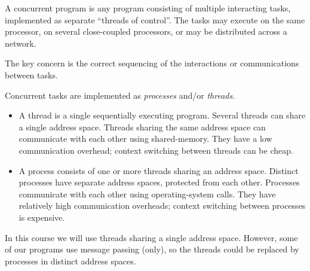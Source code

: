 \documentclass[notes,color]{sepslide0}
\begin{document}

\begin{slide}

A concurrent program is any program consisting of multiple interacting tasks,
implemented as separate ``threads of control''.  The tasks may execute on the
same processor, on several close-coupled processors, or may be distributed
across a network.

The key concern is the correct sequencing of the interactions or
communications between tasks. 


\end{slide}


\begin{slide}

Concurrent tasks are  implemented as \emph{processes} and/or \emph{threads}.
%
\begin{itemize}
\item 
A thread is a single sequentially executing program.  
Several threads can share a single address space.  Threads sharing the same
address space can communicate with each
other using shared-memory.
They have a low communication overhead; context switching between threads can
be cheap.

\item
A process consists of one or more threads sharing an address space.  Distinct
processes have separate address spaces, protected from each other.  Processes
communicate with each other  using operating-system calls.  They have
relatively high communication overheads; context switching between processes
is expensive.
\end{itemize}
%

In this course we will use threads sharing a single address space.  However,
some of our programs use message passing (only), so the threads could be
replaced by processes in distinct address spaces.
\end{slide}
\end{document}
